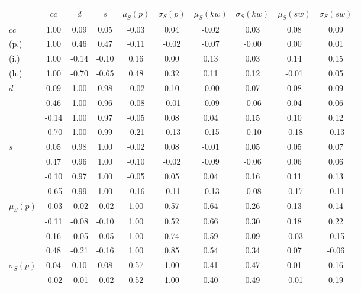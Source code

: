 \begin{table*}[h!]
\begin{center}
\begin{tabular}{| l | c | c | c | c | c | c | c | c | c |}\hline
 & $cc$ & $d$ & $s$ & $\mu_S(p)$ & $\sigma_S(p)$ & $\mu_S(kw)$ & $\sigma_S(kw)$ & $\mu_S(sw)$ & $\sigma_S(sw)$ \\\hline
$cc$ & 1.00  & 0.09  & 0.05  & -0.03  & 0.04  & -0.02  & 0.03  & 0.08  & 0.09 \\\hline
(p.) & 1.00  & 0.46  & 0.47  & -0.11  & -0.02  & -0.07  & -0.00  & 0.00  & 0.01 \\\hline
(i.) & 1.00  & -0.14  & -0.10  & 0.16  & 0.00  & 0.13  & 0.03  & 0.14  & 0.15 \\\hline
(h.) & 1.00  & -0.70  & -0.65  & 0.48  & 0.32  & 0.11  & 0.12  & -0.01  & 0.05 \\\hline
$d$ & 0.09  & 1.00  & 0.98  & -0.02  & 0.10  & -0.00  & 0.07  & 0.08  & 0.09 \\\hline
 & 0.46  & 1.00  & 0.96  & -0.08  & -0.01  & -0.09  & -0.06  & 0.04  & 0.06 \\\hline
 & -0.14  & 1.00  & 0.97  & -0.05  & 0.08  & 0.04  & 0.15  & 0.10  & 0.12 \\\hline
 & -0.70  & 1.00  & 0.99  & -0.21  & -0.13  & -0.15  & -0.10  & -0.18  & -0.13 \\\hline
$s$ & 0.05  & 0.98  & 1.00  & -0.02  & 0.08  & -0.01  & 0.05  & 0.05  & 0.07 \\\hline
 & 0.47  & 0.96  & 1.00  & -0.10  & -0.02  & -0.09  & -0.06  & 0.06  & 0.06 \\\hline
 & -0.10  & 0.97  & 1.00  & -0.05  & 0.05  & 0.04  & 0.16  & 0.11  & 0.13 \\\hline
 & -0.65  & 0.99  & 1.00  & -0.16  & -0.11  & -0.13  & -0.08  & -0.17  & -0.11 \\\hline
$\mu_S(p)$ & -0.03  & -0.02  & -0.02  & 1.00  & 0.57  & 0.64  & 0.26  & 0.13  & 0.14 \\\hline
 & -0.11  & -0.08  & -0.10  & 1.00  & 0.52  & 0.66  & 0.30  & 0.18  & 0.22 \\\hline
 & 0.16  & -0.05  & -0.05  & 1.00  & 0.74  & 0.59  & 0.09  & -0.03  & -0.15 \\\hline
 & 0.48  & -0.21  & -0.16  & 1.00  & 0.85  & 0.54  & 0.34  & 0.07  & -0.06 \\\hline
$\sigma_S(p)$ & 0.04  & 0.10  & 0.08  & 0.57  & 1.00  & 0.41  & 0.47  & 0.01  & 0.16 \\\hline
 & -0.02  & -0.01  & -0.02  & 0.52  & 1.00  & 0.40  & 0.49  & -0.01  & 0.19 \\\hline

\end{tabular}
\end{center}
\end{table*}
